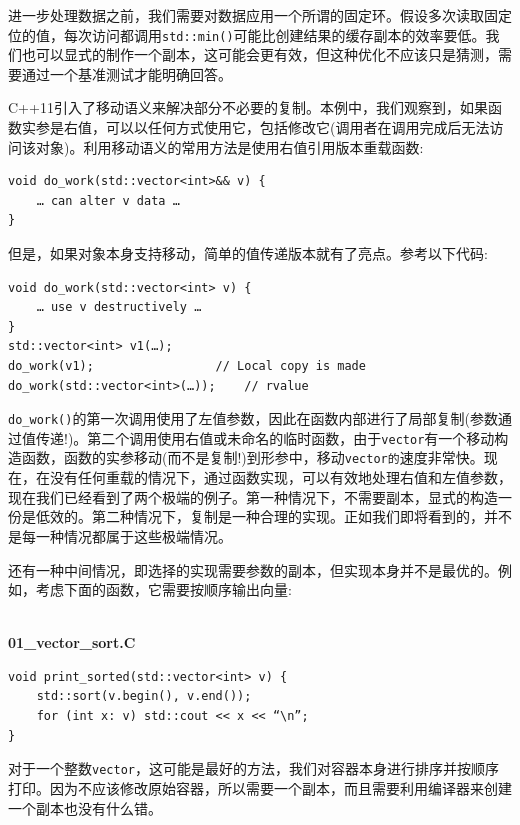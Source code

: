 进一步处理数据之前，我们需要对数据应用一个所谓的固定环。假设多次读取固定位的值，每次访问都调用\texttt{std::min()}可能比创建结果的缓存副本的效率要低。我们也可以显式的制作一个副本，这可能会更有效，但这种优化不应该只是猜测，需要通过一个基准测试才能明确回答。

C++11引入了移动语义来解决部分不必要的复制。本例中，我们观察到，如果函数实参是右值，可以以任何方式使用它，包括修改它(调用者在调用完成后无法访问该对象)。利用移动语义的常用方法是使用右值引用版本重载函数:

\begin{lstlisting}[style=styleCXX]
void do_work(std::vector<int>&& v) {
	… can alter v data … 
}
\end{lstlisting}

但是，如果对象本身支持移动，简单的值传递版本就有了亮点。参考以下代码:

\begin{lstlisting}[style=styleCXX]
void do_work(std::vector<int> v) {
	… use v destructively … 
}
std::vector<int> v1(…);
do_work(v1);                 // Local copy is made
do_work(std::vector<int>(…));    // rvalue
\end{lstlisting}

\texttt{do\_work()}的第一次调用使用了左值参数，因此在函数内部进行了局部复制(参数通过值传递!)。第二个调用使用右值或未命名的临时函数，由于\texttt{vector}有一个移动构造函数，函数的实参移动(而不是复制!)到形参中，移动\texttt{vector的}速度非常快。现在，在没有任何重载的情况下，通过函数实现，可以有效地处理右值和左值参数，现在我们已经看到了两个极端的例子。第一种情况下，不需要副本，显式的构造一份是低效的。第二种情况下，复制是一种合理的实现。正如我们即将看到的，并不是每一种情况都属于这些极端情况。


还有一种中间情况，即选择的实现需要参数的副本，但实现本身并不是最优的。例如，考虑下面的函数，它需要按顺序输出向量:

\hspace*{\fill} \\ %
\noindent
\textbf{01\_vector\_sort.C}
\begin{lstlisting}[style=styleCXX]
void print_sorted(std::vector<int> v) {
	std::sort(v.begin(), v.end());
	for (int x: v) std::cout << x << “\n”;
}
\end{lstlisting}

对于一个整数\texttt{vector}，这可能是最好的方法，我们对容器本身进行排序并按顺序打印。因为不应该修改原始容器，所以需要一个副本，而且需要利用编译器来创建一个副本也没有什么错。


